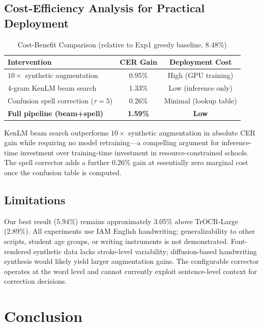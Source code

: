 \documentclass[conference]{IEEEtran}
\begin{document}
\subsection{Cost-Efficiency Analysis for Practical Deployment}

\begin{table}[h]
\centering
\caption{Cost-Benefit Comparison (relative to Exp1 greedy baseline, 8.48\%)}
\label{tab:costbenefit}
\begin{tabular}{@{}lcc@{}}
\toprule
\textbf{Intervention} & \textbf{CER Gain} & \textbf{Deployment Cost} \\
\midrule
$10\times$ synthetic augmentation  & 0.95\% & High (GPU training)  \\
4-gram KenLM beam search           & 1.33\% & Low (inference only) \\
Confusion spell correction ($\tau=5$) & 0.26\% & Minimal (lookup table) \\
\midrule
\textbf{Full pipeline (beam+spell)} & \textbf{1.59\%} & \textbf{Low} \\
\bottomrule
\end{tabular}
\end{table}

KenLM beam search outperforms $10\times$ synthetic augmentation in absolute CER gain while requiring no model retraining---a compelling argument for inference-time investment over training-time investment in resource-constrained schools. The spell corrector adds a further 0.26\% gain at essentially zero marginal cost once the confusion table is computed.

\subsection{Limitations}

Our best result (5.94\%) remains approximately 3.05\% above TrOCR-Large (2.89\%). All experiments use IAM English handwriting; generalizability to other scripts, student age groups, or writing instruments is not demonstrated. Font-rendered synthetic data lacks stroke-level variability; diffusion-based handwriting synthesis would likely yield larger augmentation gains. The configurable corrector operates at the word level and cannot currently exploit sentence-level context for correction decisions.

\section{Conclusion}
\end{document}
